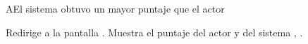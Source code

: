 \begin{UCtrayectoriaA}%
  {A}{El sistema obtuvo un mayor puntaje que el actor}

  \Sistema Redirige a la pantalla .
  \Sistema Muestra el puntaje del actor y del sistema , .

\end{UCtrayectoriaA}

